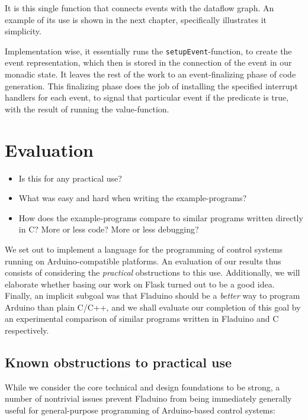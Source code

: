 \documentclass[a4paper, oneside, final]{memoir}
\let\Fref\undefined
\begin{document}
\noindent
It is this single function that connects events with the dataflow
graph. An example of its use is shown in the next chapter,
specifically \Fref{fig:onEvent usage} illustrates it simplicity.

Implementation wise, it essentially runs the
\verb|setupEvent|-function, to create the event representation, which
then is stored in the connection of the event in our monadic state.
It leaves the rest of the work to an event-finalizing phase of code
generation.  This finalizing phase does the job of installing the
specified interrupt handlers for each event, to signal that particular
event if the predicate is true, with the result of running the
value-function.

\chapter{Evaluation}
\label{chap:evaluation}

\begin{itemize}
\item Is this for any practical use?
\item What was easy and hard when writing the example-programs?
\item How does the example-programs compare to similar programs
  written directly in C? More or less code? More or less debugging?
\end{itemize}

We set out to implement a language for the programming of control
systems running on Arduino-compatible platforms.  An evaluation of our
results thus consists of considering the \textit{practical}
obstructions to this use.  Additionally, we will elaborate whether
basing our work on Flask turned out to be a good idea.  Finally, an
implicit subgoal was that Fladuino should be a \textit{better} way to
program Arduino than plain C/C++, and we shall evaluate our completion
of this goal by an experimental comparison of similar programs written
in Fladuino and C respectively.

\section{Known obstructions to practical use}

While we consider the core technical and design foundations to be
strong, a number of nontrivial issues prevent Fladuino from being
immediately generally useful for general-purpose programming of
Arduino-based control systems:
\end{document}
